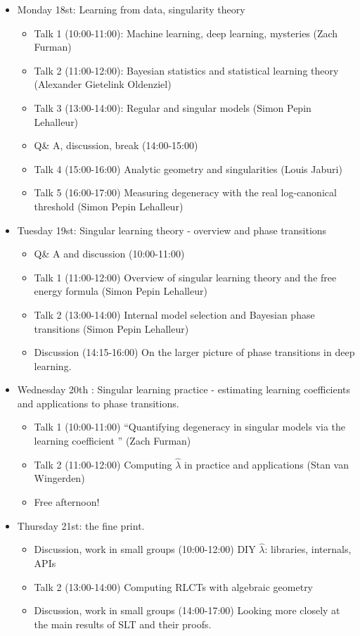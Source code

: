 \documentclass[a4paper,11pt]{amsart}
\newcommand{\lambdahat}{\widehat{\lambda}}
\begin{document}
\begin{itemize}
\item Monday 18st: Learning from data, singularity theory
  \begin{itemize}
  \item Talk 1 (10:00-11:00): Machine learning, deep learning, mysteries (Zach Furman)
  \item Talk 2 (11:00-12:00): Bayesian statistics and statistical learning theory (Alexander Gietelink Oldenziel)
  \item Talk 3 (13:00-14:00): Regular and singular models (Simon Pepin Lehalleur)
  \item Q\& A, discussion, break (14:00-15:00)
  \item Talk 4 (15:00-16:00) Analytic geometry and singularities (Louis Jaburi)
  \item Talk 5 (16:00-17:00) Measuring degeneracy with the real log-canonical threshold (Simon Pepin Lehalleur)
  \end{itemize}
\item Tuesday 19st: Singular learning theory - overview and phase transitions
  \begin{itemize}
  \item Q\& A and discussion (10:00-11:00)
  \item Talk 1 (11:00-12:00) Overview of singular learning theory and the free energy formula (Simon Pepin Lehalleur)
  \item Talk 2 (13:00-14:00) Internal model selection and Bayesian phase transitions (Simon Pepin Lehalleur)
  \item Discussion (14:15-16:00) On the larger picture of phase transitions in deep learning.
  \end{itemize}
\item Wednesday 20th : Singular learning practice - estimating learning coefficients and applications to phase transitions.
  \begin{itemize}
  \item Talk 1 (10:00-11:00) ``Quantifying degeneracy in singular models via the learning coefficient '' (Zach Furman)
  \item Talk 2 (11:00-12:00) Computing $\lambdahat$ in practice and applications (Stan van Wingerden)
\item Free afternoon!
  \end{itemize}
\item Thursday 21st: the fine print.
  \begin{itemize}
  \item Discussion, work in small groups (10:00-12:00) DIY $\lambdahat$: libraries, internals, APIs
  \item Talk 2 (13:00-14:00) Computing RLCTs with algebraic geometry
\item Discussion, work in small groups (14:00-17:00) Looking more closely at the main results of SLT and their proofs.
  \end{itemize}
\end{itemize}
\end{document}
